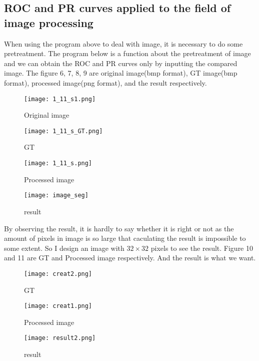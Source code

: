 \documentclass[a4paper,12pt]{article}
\begin{document}
\subsection{ROC and PR curves applied to the field of image processing}
When using the program above to deal with image, it is necessary to do some pretreatment. The program below is a function about the pretreatment of image and we can obtain the ROC and PR curves only by inputting the compared image. The figure 6, 7, 8, 9 are original image(bmp format), GT image(bmp format), processed image(png format), and the result respectively. 

\begin{figure}[!ht]
\centering\texttt{[image: 1\_11\_s1.png]}
\caption{Original image}
\end{figure} 

\begin{figure}[!ht]
\begin{minipage}[t]{0.5\textwidth}
\centering\texttt{[image: 1\_11\_s\_GT.png]}
\caption{GT}
\end{minipage} 
\begin{minipage}[t]{0.5\textwidth}
\texttt{[image: 1\_11\_s.png]}
\caption{Processed image}
\end{minipage}
\end{figure} 

\begin{figure}[!ht]
\centering\texttt{[image: image\_seg]}
\caption{result}
\end{figure} 

By observing the result, it is hardly to say whether it is right or not as the amount of pixels in image is so large that caculating the result is impossible to some extent. So I design an image with $32\times32$ pixels to see the result. Figure 10 and 11 are GT and Processed image respectively. And the result is what we want.


\begin{figure}[!ht]
\begin{minipage}[t]{0.5\textwidth}
\texttt{[image: creat2.png]}
\caption{GT}
\end{minipage}
\begin{minipage}[t]{0.5\textwidth}
\centering\texttt{[image: creat1.png]}
\caption{Processed image}
\end{minipage}
\end{figure} 
\begin{figure}[!ht]
\centering\texttt{[image: result2.png]}
\caption{result}
\end{figure}
\end{document}
